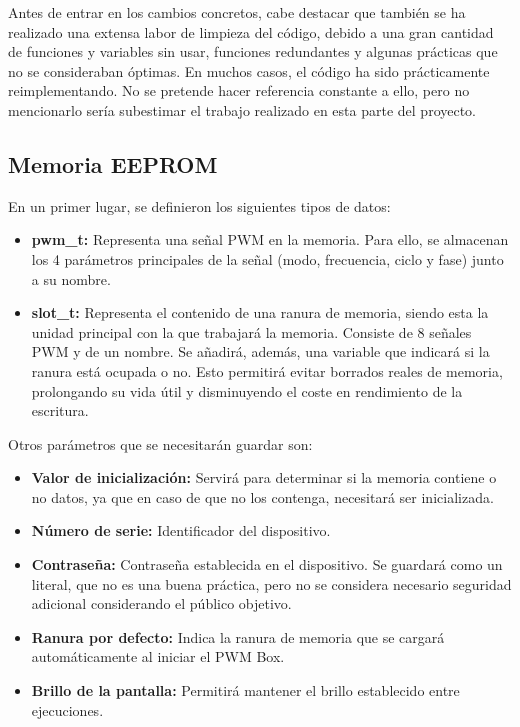 Antes de entrar en los cambios concretos, cabe destacar que también se ha realizado una extensa labor de limpieza del código, debido a una gran cantidad de funciones y variables sin usar, funciones redundantes y algunas prácticas que no se consideraban óptimas. En muchos casos, el código ha sido prácticamente reimplementando. No se pretende hacer referencia constante a ello, pero no mencionarlo sería subestimar el trabajo realizado en esta parte del proyecto.

\subsection{Memoria EEPROM}

En un primer lugar, se definieron los siguientes tipos de datos:

\begin{itemize}
    \item\textbf{pwm\_t:} Representa una señal PWM en la memoria. Para ello, se almacenan los 4 parámetros principales de la señal (modo, frecuencia, ciclo y fase) junto a su nombre.
    \item\textbf{slot\_t:} Representa el contenido de una ranura de memoria, siendo esta la unidad principal con la que trabajará la memoria. Consiste de 8 señales PWM y de un nombre. Se añadirá, además, una variable que indicará si la ranura está ocupada o no. Esto permitirá evitar borrados reales de memoria, prolongando su vida útil y disminuyendo el coste en rendimiento de la escritura.
\end{itemize}

Otros parámetros que se necesitarán guardar son:

\begin{itemize}
    \item\textbf{Valor de inicialización:} Servirá para determinar si la memoria contiene o no datos, ya que en caso de que no los contenga, necesitará ser inicializada.
    \item\textbf{Número de serie:} Identificador del dispositivo.
    \item\textbf{Contraseña:} Contraseña establecida en el dispositivo. Se guardará como un literal, que no es una buena práctica, pero no se considera necesario seguridad adicional considerando el público objetivo.
    \item\textbf{Ranura por defecto:} Indica la ranura de memoria que se cargará automáticamente al iniciar el PWM Box.
    \item\textbf{Brillo de la pantalla:} Permitirá mantener el brillo establecido entre ejecuciones.
\end{itemize}

